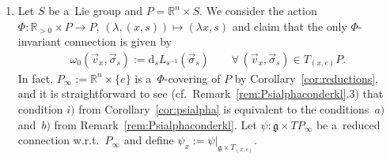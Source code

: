 \documentclass[pdftex]{sigma}
\numberwithin{equation}{section}
\begin{document}
\begin{Example}\label{ex:OnePoint}\quad
\begin{enumerate}\itemsep=0pt
\item
Let $S$ be a~Lie group and $P=\mathbb{R}^n\times S$.
We consider the action $\Phi\colon \mathbb{R}_{>0}\times P \rightarrow P$, $(\lambda,(x,s))\mapsto (\lambda x,s)$ and
claim that the only $\Phi$-invariant connection is given by
\begin{gather*}
\omega_0(\vec{v}_x,\vec{\sigma}_s):=\mathrm{d}_sL_{s^{-1}}(\vec{\sigma}_s)
\qquad\forall\, (\vec{v}_x,\vec{\sigma}_s)\in T_{(x,e)}P.
\end{gather*}
In fact, $P_\infty:=\mathbb{R}^n\times \{e\}$ is a~$\Phi$-covering of $P$ by Corollary~\ref{cor:reductions}, and it is
straightforward to see (cf.\ Remark~\ref{rem:Psialphaconderkl}.3) that condition $i)$ from Corollary~\ref{cor:psialpha} is
equivalent to the conditions~$a)$ and~$b)$ from Remark~\ref{rem:Psialphaconderkl}.
Let $\psi\colon \mathfrak{g}\times TP_\infty$ be a~reduced connection w.r.t.~$P_{\infty}$ and def\/ine
$\psi_x:=\psi|_{\mathfrak{g}\times T_{(x,e)}}$.


\end{enumerate}
\end{Example}
\end{document}

